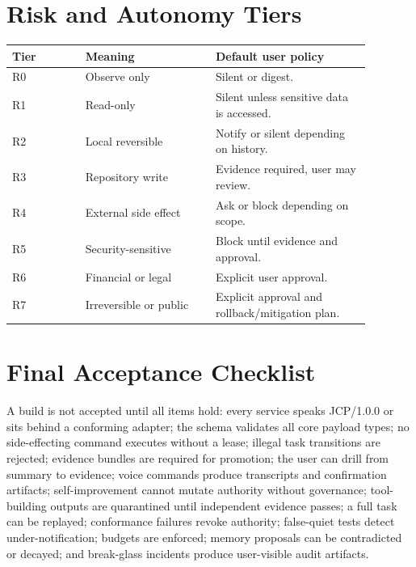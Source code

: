 \documentclass[12pt,journal,onecolumn,draftclsnofoot]{IEEEtran}
\begin{document}
\section{Risk and Autonomy Tiers}
\begin{longtable}{p{0.18\linewidth}p{0.32\linewidth}p{0.38\linewidth}}
\toprule
Tier & Meaning & Default user policy \\
\midrule
R0 & Observe only & Silent or digest. \\
R1 & Read-only & Silent unless sensitive data is accessed. \\
R2 & Local reversible & Notify or silent depending on history. \\
R3 & Repository write & Evidence required, user may review. \\
R4 & External side effect & Ask or block depending on scope. \\
R5 & Security-sensitive & Block until evidence and approval. \\
R6 & Financial or legal & Explicit user approval. \\
R7 & Irreversible or public & Explicit approval and rollback/mitigation plan. \\
\bottomrule
\end{longtable}

\section{Final Acceptance Checklist}
A build is not accepted until all items hold: every service speaks JCP/1.0.0 or sits behind a conforming adapter; the schema validates all core payload types; no side-effecting command executes without a lease; illegal task transitions are rejected; evidence bundles are required for promotion; the user can drill from summary to evidence; voice commands produce transcripts and confirmation artifacts; self-improvement cannot mutate authority without governance; tool-building outputs are quarantined until independent evidence passes; a full task can be replayed; conformance failures revoke authority; false-quiet tests detect under-notification; budgets are enforced; memory proposals can be contradicted or decayed; and break-glass incidents produce user-visible audit artifacts.
\end{document}
